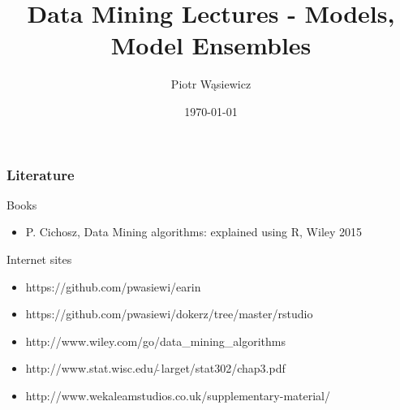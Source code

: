 \documentclass{beamer}
\title[EARIN]{Data Mining Lectures - Models, Model Ensembles}
\author{Piotr Wąsiewicz}
\institute[ICS PW]
{
Institute of Computer Science\\
\medskip
{\emph{pwasiewi@elka.pw.edu.pl}}
}
\date{\today}
\begin{document}

\lstset{frameround=trbl}
\lstset{commentstyle=\textit, stringstyle=\upshape,showspaces=false}

\begin{frame}
\titlepage
\end{frame}

\begin{frame}
\frametitle{Literature}
\begin{block}{Books}
\begin{itemize}
\item P. Cichosz, Data Mining algorithms: explained using R, Wiley 2015
\end{itemize}
\end{block}
\begin{block}{Internet sites}
\begin{itemize}
\item https://github.com/pwasiewi/earin
\item https://github.com/pwasiewi/dokerz/tree/master/rstudio
\item http://www.wiley.com/go/data\_mining\_algorithms
\item http://www.stat.wisc.edu/$\tilde{\ }$larget/stat302/chap3.pdf
\item http://www.wekaleamstudios.co.uk/supplementary-material/
\end{itemize}
\end{block}
\end{frame}
\end{document}
